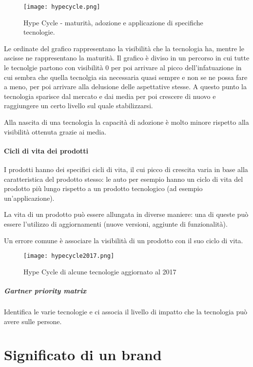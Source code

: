 \begin{figure}[H]
\centering
\texttt{[image: hypecycle.png]}
\caption{Hype Cycle - maturità, adozione e applicazione di specifiche
tecnologie.}
\label{fig:hypecycle}
\end{figure}

Le ordinate del grafico rappresentano la visibilità che la tecnologia ha,
mentre le ascisse ne rappresentano la maturità.
Il grafico è diviso in un percorso in cui tutte le tecnolgie partono con
visibilità 0 per poi arrivare al picco dell'infatuazione in cui sembra che
quella tecnolgia sia necessaria quasi sempre e non se ne possa fare a meno,
per poi arrivare alla delusione delle aspettative stesse.
A questo punto la tecnologia sparisce dal mercato e dai media per poi crescere
di nuovo e raggiungere un certo livello sul quale stabilizzarsi.

Alla nascita di una tecnologia la capacità di adozione è molto minore rispetto
alla visibilità ottenuta grazie ai media.

\paragraph*{Cicli di vita dei prodotti} I prodotti hanno dei specifici cicli di
vita, il cui picco di crescita varia in base alla caratteristica del prodotto
stesso: le auto per esempio hanno un ciclo di vita del prodotto più lungo
rispetto a un prodotto tecnologico (ad esempio un'applicazione).

La vita di un prodotto può essere allungata in diverse maniere:
una di queste può essere l'utilizzo di aggiornamenti (nuove versioni,
aggiunte di funzionalità).

Un errore comune è associare la visibilità di un prodotto con il suo ciclo di
vita.

\begin{figure}[H]
\centering
\texttt{[image: hypecycle2017.png]}
\caption{Hype Cycle di alcune tecnologie aggiornato al 2017}
\label{fig:hypecycle}
\end{figure}

\subparagraph*{Gartner priority matrix} Identifica le varie tecnologie e ci
associa il livello di impatto che la tecnologia può avere sulle persone.

\section{Significato di un brand}

